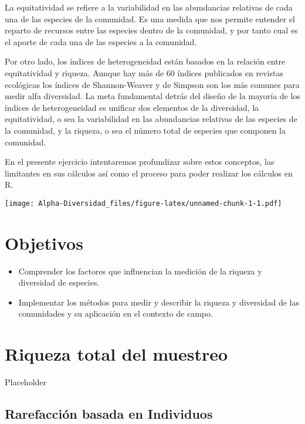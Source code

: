 \documentclass[]{book}
\providecommand{\tightlist}{%
  \setlength{\itemsep}{0pt}\setlength{\parskip}{0pt}}
\begin{document}
La equitatividad se refiere a la variabilidad en las abundancias
relativas de cada una de las especies de la comunidad. Es una medida que
nos permite entender el reparto de recursos entre las especies dentro de
la comunidad, y por tanto cual es el aporte de cada una de las especies
a la comunidad.

Por otro lado, los índices de heterogeneidad están basados en la
relación entre equitatividad y riqueza. Aunque hay más de 60 índices
publicados en revistas ecológicas los índices de Shannon-Weaver y de
Simpson son los más comunes para medir alfa diversidad. La meta
fundamental detrás del diseño de la mayoría de los índices de
heterogeneidad es unificar dos elementos de la diversidad, la
equitatividad, o sea la variabilidad en las abundancias relativas de las
especies de la comunidad, y la riqueza, o sea el número total de
especies que componen la comunidad.

En el presente ejercicio intentaremos profundizar sobre estos conceptos,
las limitantes en sus cálculos así como el proceso para poder realizar
los cálculos en R.

\texttt{[image: Alpha-Diversidad\_files/figure-latex/unnamed-chunk-1-1.pdf]}

\chapter*{Objetivos}\label{objetivos}

\begin{itemize}
\tightlist
\item
  Comprender los factores que influencian la medición de la riqueza y
  diversidad de especies.
\end{itemize}

\begin{itemize}
\tightlist
\item
  Implementar los métodos para medir y describir la riqueza y diversidad
  de las comunidades y su aplicación en el contexto de campo.
\end{itemize}

\chapter{Riqueza total del muestreo}\label{riqueza-total-del-muestreo}

Placeholder

\section{Rarefacción basada en
Individuos}\label{rarefaccion-basada-en-individuos}
\end{document}
